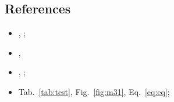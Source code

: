 \documentclass[12pt,a4paper]{article}
\begin{document}
\subsection{References}
\begin{itemize}
\item {}, ;
\item {}, 
\item {}, ;
\item Tab.~\ref{tab:test}, Fig.~\ref{fig:m31}, Eq.~\ref{eq:eq};
\end{itemize}


\newpage

\listofreq
\listofquestion

\label{LastPage}
\end{document}
